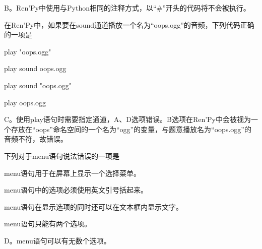 \documentclass[../Exercises.tex]{subfiles}
\begin{document}
\begin{solution}[pre-analysis=【答案】]
    B。Ren'Py中使用与Python相同的注释方式，以“\#”开头的代码将不会被执行。
\end{solution}

\begin{question}
    在Ren'Py中，如果要在sound通道播放一个名为“oops.ogg”的音频，下列代码正确的一项是\paren
    \begin{choices}
        \item \textsf{play "oops.ogg"}
        \item \textsf{play sound oops.ogg}
        \item \textsf{play sound "oops.ogg"}
        \item \textsf{play oops.ogg}
    \end{choices}
\end{question}

\begin{solution}
    C。使用play语句时需要指定通道，A、D选项错误。B选项在Ren'Py中会被视为一个存放在“oops”命名空间的一个名为“ogg”的变量，与题意播放名为“oops.ogg”的音频不符，故错误。
\end{solution}

\begin{question}
    下列对于menu语句说法错误的一项是\paren
    \begin{choices}
        \item menu语句用于在屏幕上显示一个选择菜单。
        \item menu语句中的选项必须使用英文引号括起来。
        \item menu语句在显示选项的同时还可以在文本框内显示文字。
        \item menu语句只能有两个选项。
    \end{choices}
\end{question}

\begin{solution}[pre-analysis=【答案】]
    D。menu语句可以有无数个选项。
\end{solution}
\end{document}
